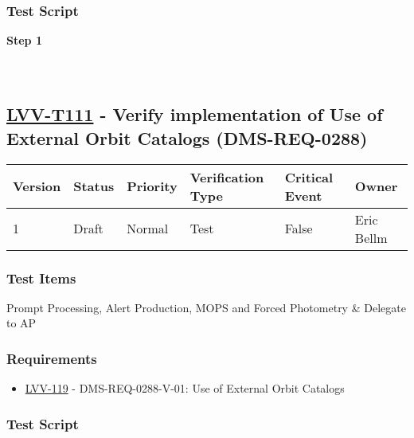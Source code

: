 \hypertarget{test-script-87}{%
\subsubsection{Test Script}\label{test-script-87}}

\textbf{Step 1}\\
~\\
~\\

\hypertarget{lvv-t111---verify-implementation-of-use-of-external-orbit-catalogs-dms-req-0288}{%
\subsection{\texorpdfstring{\href{https://jira.lsstcorp.org/secure/Tests.jspa\#/testCase/LVV-T111}{LVV-T111}
- Verify implementation of Use of External Orbit Catalogs
(DMS-REQ-0288)}{LVV-T111 - Verify implementation of Use of External Orbit Catalogs (DMS-REQ-0288)}}\label{lvv-t111---verify-implementation-of-use-of-external-orbit-catalogs-dms-req-0288}}

\begin{longtable}[]{@{}llllll@{}}
\toprule
Version & Status & Priority & Verification Type & Critical Event &
Owner\tabularnewline
\midrule
\endhead
1 & Draft & Normal & Test & False & Eric Bellm\tabularnewline
\bottomrule
\end{longtable}

\hypertarget{test-items-87}{%
\subsubsection{Test Items}\label{test-items-87}}

Prompt Processing, Alert Production, MOPS and Forced Photometry \&
Delegate to AP

\hypertarget{requirements-88}{%
\subsubsection{Requirements}\label{requirements-88}}

\begin{itemize}
\tightlist
\item
  \href{https://jira.lsstcorp.org/browse/LVV-119}{LVV-119} -
  DMS-REQ-0288-V-01: Use of External Orbit Catalogs
\end{itemize}

\hypertarget{test-script-88}{%
\subsubsection{Test Script}\label{test-script-88}}

